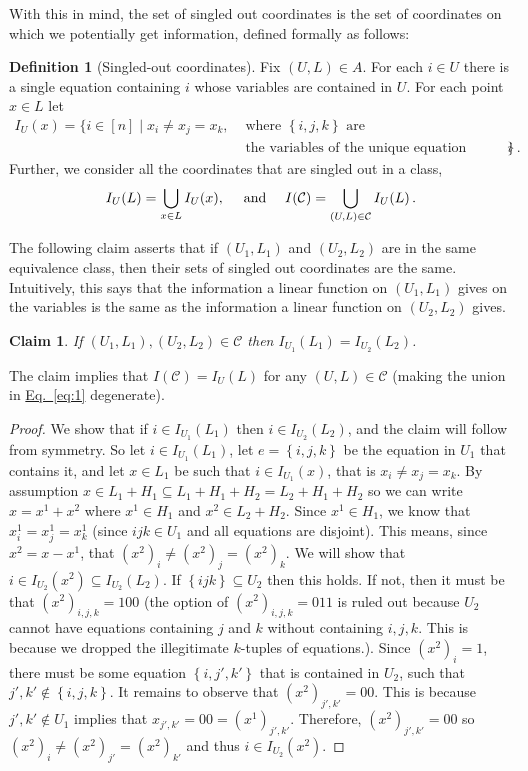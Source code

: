\documentclass[11pt]{article}
\numberwithin{equation}{section}
\newtheorem{claim}[theorem]{Claim}
\theoremstyle{definition}
\newtheorem{definition}[theorem]{Definition}
\theoremstyle{plain}
\newcommand{\C}{\mathbb C}
\newcommand{\expeqref}[2]{\hyperref[#2]{#1~\eqref{#2}}}
\newcommand\set[1]{{\left\{ #1 \right\}}}
\renewcommand\subset{\subseteq}
\def\C{\mathcal{C}}
\begin{document}
With this in mind, the set of singled out coordinates is the set of coordinates on which we potentially get information, defined formally as follows:
%
\begin{definition}[Singled-out coordinates]   %
Fix $(U,L) \in A$. For each $i\in U$ there is a single equation containing $i$ whose variables are contained in $U$.  For each point $x\in L$ let
%
%
%
%
\begin{align*}
I_U(x) = \{ i\in [n] \mid x_i \neq x_j=x_k, & \text{ where }\set{i,j,k}\text{ are } \\
    & \text{ the variables of the unique equation containing $i$} \}\,.
\end{align*}   %
Further, we consider all the coordinates that are singled out in a class,
\begin{equation}
  \label{eq:1}
I_U(L) = \bigcup_{x\in L}I_U(x), \quad \hbox{ and }\quad I(\C) = \bigcup_{(U,L)\in \C} I_U(L)\,.
\end{equation}
\end{definition}

The following claim asserts that if $(U_1,L_1)$ and $(U_2,L_2)$ are in the same equivalence class, then their sets of singled out coordinates
are the same. Intuitively, this says that the information a linear function on $(U_1,L_1)$ gives on the variables
is the same as the information a linear function on $(U_2,L_2)$ gives.
\begin{claim}\label{claim:singled}
If $(U_1,L_1),(U_2,L_2)\in\C$ then $I_{U_1}(L_1)=I_{U_2}(L_2)$.
\end{claim}
The claim implies that $I(\C) = I_U(L)$ for any $(U,L)\in \C$ (making
the union in \expeqref{Eq.}{eq:1} degenerate).
%
%
\begin{proof}
We  show that if $i \in I_{U_1}(L_1)$ then $i\in I_{U_2}(L_2)$, and the claim will follow from symmetry.
So let $i \in I_{U_1}(L_1)$, let $e=\set{i,j,k}$ be the equation in
$U_1$ that contains it, and let $x\in L_1$ be such that $i\in
I_{U_1}(x)$, that is  $x_i\neq x_j=x_k$. By assumption $x\in L_1 + H_1 \subset L_1 + H_1 + H_2 = L_2 + H_1 + H_2$ so we can write $x = x^1 + x^2$ where $x^1 \in H_1$ and $x^2 \in L_2+H_2$. Since $x^1\in H_1$, we know that $x^1_i=x^1_j=x^1_k$ (since $ijk \in U_1$ and all equations are disjoint). This means, since $x^2 = x - x^1$, that $(x^2)_i \neq (x^2)_j = (x^2)_k$. We will show that $i \in I_{U_2}(x^2) \subset I_{U_2}(L_2)$.
If $\set {ijk}\subset U_2$ then this holds. If not, then it must be
that $(x^2)_{i,j,k} = 100$ (the option of $(x^2)_{i,j,k} = 011$ is
ruled out because $U_2$ cannot have equations containing $j$ and $k$
without containing $i,j,k$. This is because we dropped the illegitimate $k$-tuples of equations.). Since $(x^2)_i=1$, there must be some
equation $\set{i,j',k'}$ that is contained in $U_2$, such that
$j',k'\not\in\set{i,j,k}$. It remains to observe that
$(x^2)_{j',k'}=00$. This is because $j',k'\not\in U_1$ implies that
$x_{j',k'}=00 = (x^1)_{j',k'}$. Therefore, $(x^2)_{j',k'}=00$ so
$(x^2)_i \neq (x^2)_{j'} = (x^2)_{k'}$  and thus $i\in I_{U_2}(x^2)$.
\end{proof}
\end{document}
